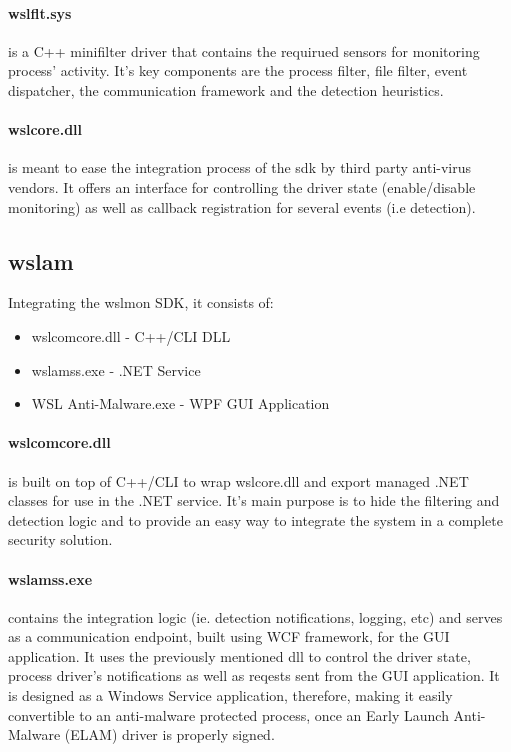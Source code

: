         \paragraph{wslflt.sys}
        is a C++ minifilter driver that contains the requirued sensors for monitoring process' activity. It's key components are the
        process filter, file filter, event dispatcher, the communication framework and the detection heuristics.

        \paragraph{wslcore.dll}
        is meant to ease the integration process of the sdk by third party anti-virus vendors. It offers an interface for controlling the driver
        state (enable/disable monitoring) as well as callback registration for several events (i.e detection).

    \subsection{wslam}
        Integrating the wslmon SDK, it consists of:
        
        \begin{itemize}
            \item wslcomcore.dll - C++/CLI DLL
            \item wslamss.exe - .NET Service
            \item WSL Anti-Malware.exe - WPF GUI Application
        \end{itemize}

        \paragraph{wslcomcore.dll} is built on top of C++/CLI to wrap wslcore.dll and export managed .NET classes
        for use in the .NET service. It's main purpose is to hide the filtering and detection logic and to provide an easy way to integrate
        the system in a complete security solution.

        \paragraph{wslamss.exe} contains the integration logic (ie. detection notifications, logging, etc) and serves as a communication
        endpoint, built using WCF framework, for the GUI application. It uses the previously mentioned dll to control the driver state, process
        driver's notifications as well as reqests sent from the GUI application. It is designed as a Windows Service application, therefore,
        making it easily convertible to an anti-malware protected process, once an Early Launch Anti-Malware (ELAM) driver is properly signed.

